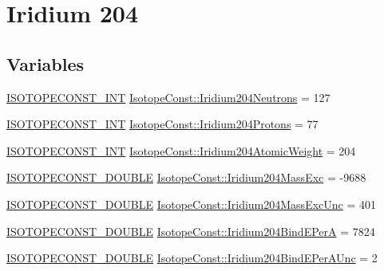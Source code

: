 \hypertarget{group___isotope_const-_iridium-_ir204}{}\section{Iridium 204}
\label{group___isotope_const-_iridium-_ir204}
\subsection*{Variables}
\begin{DoxyCompactItemize}
\item 
\mbox{\hyperlink{group___isotope_const-_macros_ga5f18360b3e99483a35c32d789e62621c}{I\+S\+O\+T\+O\+P\+E\+C\+O\+N\+S\+T\+\_\+\+I\+NT}} \mbox{\hyperlink{group___isotope_const-_iridium-_ir204_gaae76473cf9e6d713b1d5dd751a66bcac}{Isotope\+Const\+::\+Iridium204\+Neutrons}} = 127
\item 
\mbox{\hyperlink{group___isotope_const-_macros_ga5f18360b3e99483a35c32d789e62621c}{I\+S\+O\+T\+O\+P\+E\+C\+O\+N\+S\+T\+\_\+\+I\+NT}} \mbox{\hyperlink{group___isotope_const-_iridium-_ir204_gab9dc7775f5900b2ea9f49e481ea5aef7}{Isotope\+Const\+::\+Iridium204\+Protons}} = 77
\item 
\mbox{\hyperlink{group___isotope_const-_macros_ga5f18360b3e99483a35c32d789e62621c}{I\+S\+O\+T\+O\+P\+E\+C\+O\+N\+S\+T\+\_\+\+I\+NT}} \mbox{\hyperlink{group___isotope_const-_iridium-_ir204_gaa93f154e59e5fa6ec9f0110e82fc2b98}{Isotope\+Const\+::\+Iridium204\+Atomic\+Weight}} = 204
\item 
\mbox{\hyperlink{group___isotope_const-_macros_ga8f45a7272ce02c0b4c65c44636ed719a}{I\+S\+O\+T\+O\+P\+E\+C\+O\+N\+S\+T\+\_\+\+D\+O\+U\+B\+LE}} \mbox{\hyperlink{group___isotope_const-_iridium-_ir204_gaeb71a63f7496fec7d178ba80c3656e95}{Isotope\+Const\+::\+Iridium204\+Mass\+Exc}} = -\/9688
\item 
\mbox{\hyperlink{group___isotope_const-_macros_ga8f45a7272ce02c0b4c65c44636ed719a}{I\+S\+O\+T\+O\+P\+E\+C\+O\+N\+S\+T\+\_\+\+D\+O\+U\+B\+LE}} \mbox{\hyperlink{group___isotope_const-_iridium-_ir204_ga6220ccc3c95eab9268c78bb33f30efcf}{Isotope\+Const\+::\+Iridium204\+Mass\+Exc\+Unc}} = 401
\item 
\mbox{\hyperlink{group___isotope_const-_macros_ga8f45a7272ce02c0b4c65c44636ed719a}{I\+S\+O\+T\+O\+P\+E\+C\+O\+N\+S\+T\+\_\+\+D\+O\+U\+B\+LE}} \mbox{\hyperlink{group___isotope_const-_iridium-_ir204_ga85a4bf7c1cdcc445f0d743a6b3dc6fa0}{Isotope\+Const\+::\+Iridium204\+Bind\+E\+PerA}} = 7824
\item 
\mbox{\hyperlink{group___isotope_const-_macros_ga8f45a7272ce02c0b4c65c44636ed719a}{I\+S\+O\+T\+O\+P\+E\+C\+O\+N\+S\+T\+\_\+\+D\+O\+U\+B\+LE}} \mbox{\hyperlink{group___isotope_const-_iridium-_ir204_gafc8678f5ae52c18307a790cde1d2717a}{Isotope\+Const\+::\+Iridium204\+Bind\+E\+Per\+A\+Unc}} = 2

\end{DoxyCompactItemize}
